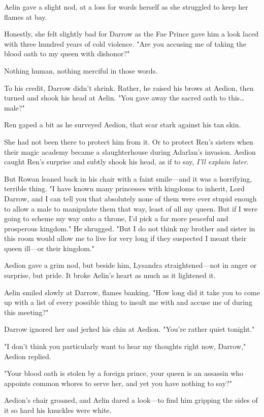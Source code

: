 Aelin gave a slight nod, at a loss for words herself as she struggled to keep her flames at bay.

Honestly, she felt slightly bad for Darrow as the Fae Prince gave him a look laced with three hundred years of cold violence. 
"Are you accusing me of taking the blood oath to my queen with dishonor?"

Nothing human, nothing merciful in those words.

To his credit, Darrow didn't shrink. 
Rather, he raised his brows at Aedion, then turned and shook his head at Aelin. 
"You gave away the sacred oath to this\ldots male?"

Ren gaped a bit as he surveyed Aedion, that scar stark against his tan skin.

She had not been there to protect him from it. 
Or to protect Ren's sisters when their magic academy became a slaughterhouse during Adarlan's invasion. 
Aedion caught Ren's surprise and subtly shook his head, as if to say, \emph{I'll explain later}.

But Rowan leaned back in his chair with a faint smile---and it was a horrifying, terrible thing. 
"I have known many princesses with kingdoms to inherit, Lord Darrow, and I can tell you that absolutely none of them were ever stupid enough to allow a male to manipulate them that way, least of all my queen. 
But if I were going to scheme my way onto a throne, I'd pick a far more peaceful and prosperous kingdom." 
He shrugged.
"But I do not think my brother and sister in this room would allow me to live for very long if they suspected I meant their queen ill---or their kingdom."

Aedion gave a grim nod, but beside him, Lysandra straightened---not in anger or surprise, but pride. 
It broke Aelin's heart as much as it lightened it.

Aelin smiled slowly at Darrow, flames banking. 
"How long did it take you to come up with a list of every possible thing to insult me with and accuse me of during this meeting?"

Darrow ignored her and jerked his chin at Aedion. 
"You're rather quiet tonight."

"I don't think you particularly want to hear my thoughts right now, Darrow," Aedion replied.

"Your blood oath is stolen by a foreign prince, your queen is an assassin who appoints common whores to serve her, and yet you have nothing to say?"

Aedion's chair groaned, and Aelin dared a look---to find him gripping the sides of it so hard his knuckles were white.


